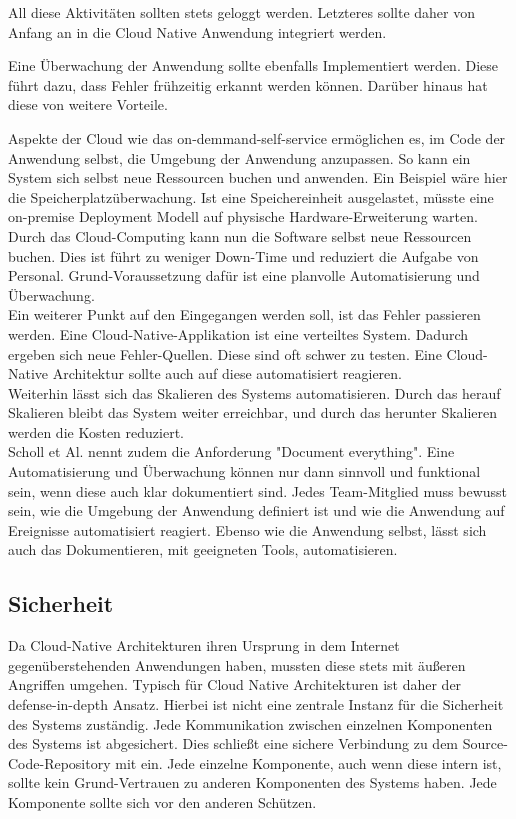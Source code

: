 All diese Aktivitäten sollten stets geloggt werden. Letzteres sollte daher von Anfang an in die Cloud Native Anwendung integriert werden. 

Eine Überwachung der Anwendung sollte ebenfalls Implementiert werden. Diese führt dazu, dass Fehler frühzeitig erkannt werden können. Darüber hinaus hat diese von weitere Vorteile.

Aspekte der Cloud wie das on-demmand-self-service ermöglichen es, im Code der Anwendung selbst, die Umgebung der Anwendung anzupassen. So kann ein System sich selbst neue Ressourcen buchen und anwenden. Ein Beispiel wäre hier die Speicherplatzüberwachung. Ist eine Speichereinheit ausgelastet, müsste eine on-premise Deployment Modell auf physische Hardware-Erweiterung warten. Durch das Cloud-Computing kann nun die Software selbst neue Ressourcen buchen. Dies ist führt zu weniger Down-Time und reduziert die Aufgabe von Personal. Grund-Voraussetzung dafür ist eine planvolle Automatisierung und Überwachung.\\ 
Ein weiterer Punkt auf den Eingegangen werden soll, ist das Fehler passieren werden. Eine Cloud-Native-Applikation ist eine verteiltes System. Dadurch ergeben sich neue Fehler-Quellen. Diese sind oft schwer zu testen. Eine Cloud-Native Architektur sollte auch auf diese automatisiert reagieren.\\
Weiterhin lässt sich das Skalieren des Systems automatisieren. Durch das herauf Skalieren bleibt das System weiter erreichbar, und durch das herunter Skalieren werden die Kosten reduziert.\\
Scholl et Al.\cite{scholl_cloud_2019} nennt zudem die Anforderung "Document everything". Eine Automatisierung und Überwachung können nur dann sinnvoll und funktional sein, wenn diese auch klar dokumentiert sind. Jedes Team-Mitglied muss bewusst sein, wie die Umgebung der Anwendung definiert ist und wie die Anwendung auf Ereignisse automatisiert reagiert. Ebenso wie die Anwendung selbst, lässt sich auch das Dokumentieren, mit geeigneten Tools, automatisieren.
\subsection{Sicherheit}
Da Cloud-Native Architekturen ihren Ursprung in dem Internet gegenüberstehenden Anwendungen haben, mussten diese stets mit äußeren Angriffen umgehen. Typisch für Cloud Native Architekturen ist daher der defense-in-depth Ansatz. Hierbei ist nicht eine zentrale Instanz für die Sicherheit des Systems zuständig. Jede Kommunikation zwischen einzelnen Komponenten des Systems ist abgesichert. Dies schließt eine sichere Verbindung zu dem Source-Code-Repository mit ein. Jede einzelne Komponente, auch wenn diese intern ist, sollte kein Grund-Vertrauen zu anderen Komponenten des Systems haben. Jede Komponente sollte sich vor den anderen Schützen.
